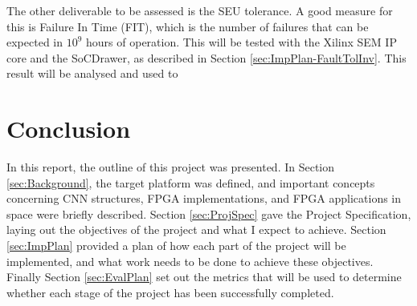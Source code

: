 \documentclass[12pt]{article}
\begin{document}
The other deliverable to be assessed is the SEU tolerance. A good measure for this is Failure In Time (FIT), which is the number of failures that can be expected in $10^9$ hours of operation. This will be tested with the Xilinx SEM IP core and the SoCDrawer, as described in Section \ref{sec:ImpPlan-FaultTolInv}. This result will be analysed and used to 

\section{Conclusion}
\label{sec:Conclusion}
\vspace{-12pt}

In this report, the outline of this project was presented. In Section \ref{sec:Background}, the target platform was defined, and important concepts concerning CNN structures, FPGA implementations, and FPGA applications in space were briefly described. Section \ref{sec:ProjSpec} gave the Project Specification, laying out the objectives of the project and what I expect to achieve. Section \ref{sec:ImpPlan} provided a plan of how each part of the project will be implemented, and what work needs to be done to achieve these objectives. Finally Section \ref{sec:EvalPlan} set out the metrics that will be used to determine whether each stage of the project has been successfully completed. 



\nocite{*}
\end{document}
